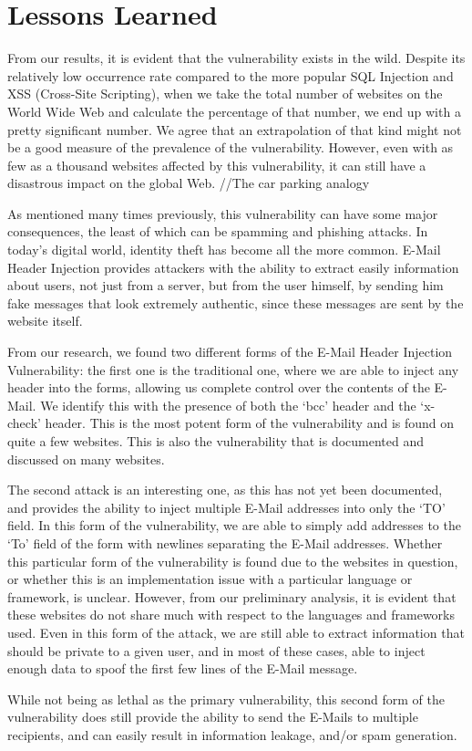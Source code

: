 \section{Lessons Learned}
    From our results, it is evident that the vulnerability exists in the wild. Despite its relatively low occurrence rate compared to the more popular SQL Injection and XSS (Cross-Site Scripting), when we take the total number of websites on the World Wide Web and calculate the percentage of that number, we end up with a pretty significant number. We agree that an extrapolation of that kind might not be a good measure of the prevalence of the vulnerability. However, even with as few as a thousand websites affected by this vulnerability, it can still have a disastrous impact on the global Web. 
    //The car parking analogy
    
    As mentioned many times previously, this vulnerability can have some major consequences, the least of which can be spamming and phishing attacks. In today's digital world, identity theft has become all the more common. E-Mail Header Injection provides attackers with the ability to extract easily information about users, not just from a server, but from the user himself, by sending him fake messages that look extremely authentic, since these messages are sent by the website itself.
    
    From our research, we found two different forms of the E-Mail Header Injection Vulnerability: the first one is the traditional one, where we are able to inject any header into the forms, allowing us complete control over the contents of the E-Mail. We identify this with the presence of both the `bcc' header and the `x-check' header. This is the most potent form of the vulnerability and is found on quite a few websites. This is also the vulnerability that is documented and discussed on many websites.
    
    The second attack is an interesting one, as this has not yet been documented, and provides the ability to inject multiple E-Mail addresses into only the `TO' field. In this form of the vulnerability, we are able to simply add addresses to the `To' field of the form with newlines separating the E-Mail addresses. Whether this particular form of the vulnerability is found due to the websites in question, or whether this is an implementation issue with a particular language or framework, is unclear. However, from our preliminary analysis, it is evident that these websites do not share much with respect to the languages and frameworks used. 
    Even in this form of the attack, we are still able to extract information that should be private to a given user, and in most of these cases, able to inject enough data to spoof the first few lines of the E-Mail message.
    
    While not being as lethal as the primary vulnerability, this second form of the vulnerability does still provide the ability to send the E-Mails to multiple recipients, and can easily result in information leakage, and/or spam generation.
    
